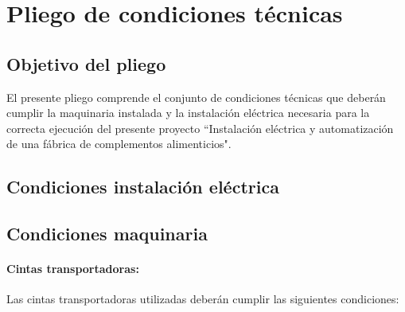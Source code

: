 \newpage\section {Pliego de condiciones técnicas}

\subsection{Objetivo del pliego}
El presente pliego comprende el conjunto de condiciones técnicas que deberán cumplir la maquinaria instalada y la instalación eléctrica necesaria para la correcta ejecución del presente proyecto ``Instalación eléctrica y automatización de una fábrica de complementos alimenticios". 

\subsection{Condiciones instalación eléctrica}


\subsection{Condiciones maquinaria}
\paragraph{Cintas transportadoras:}
		Las cintas transportadoras utilizadas deberán cumplir las siguientes condiciones:
		
